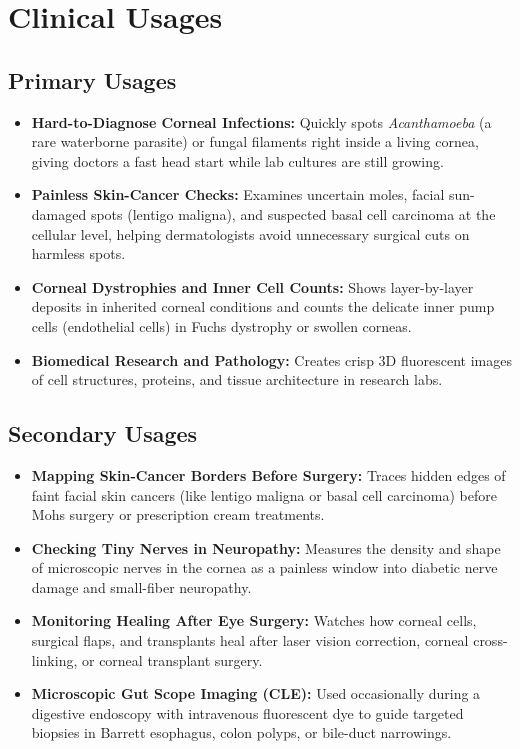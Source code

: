 \section{Clinical Usages}

\subsection{Primary Usages}
\begin{itemize}
    \item \textbf{Hard-to-Diagnose Corneal Infections:} Quickly spots \textit{Acanthamoeba} (a rare waterborne parasite) or fungal filaments right inside a living cornea, giving doctors a fast head start while lab cultures are still growing.
    \item \textbf{Painless Skin-Cancer Checks:} Examines uncertain moles, facial sun-damaged spots (lentigo maligna), and suspected basal cell carcinoma at the cellular level, helping dermatologists avoid unnecessary surgical cuts on harmless spots.
    \item \textbf{Corneal Dystrophies and Inner Cell Counts:} Shows layer-by-layer deposits in inherited corneal conditions and counts the delicate inner pump cells (endothelial cells) in Fuchs dystrophy or swollen corneas.
    \item \textbf{Biomedical Research and Pathology:} Creates crisp 3D fluorescent images of cell structures, proteins, and tissue architecture in research labs.
\end{itemize}

\subsection{Secondary Usages}
\begin{itemize}
    \item \textbf{Mapping Skin-Cancer Borders Before Surgery:} Traces hidden edges of faint facial skin cancers (like lentigo maligna or basal cell carcinoma) before Mohs surgery or prescription cream treatments.
    \item \textbf{Checking Tiny Nerves in Neuropathy:} Measures the density and shape of microscopic nerves in the cornea as a painless window into diabetic nerve damage and small-fiber neuropathy.
    \item \textbf{Monitoring Healing After Eye Surgery:} Watches how corneal cells, surgical flaps, and transplants heal after laser vision correction, corneal cross-linking, or corneal transplant surgery.
    \item \textbf{Microscopic Gut Scope Imaging (CLE):} Used occasionally during a digestive endoscopy with intravenous fluorescent dye to guide targeted biopsies in Barrett esophagus, colon polyps, or bile-duct narrowings.
\end{itemize}

